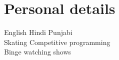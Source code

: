 \documentclass[]{deedy-resume-openfont}
\begin{document}
\begin{minipage}[t][18cm]{0.33\textwidth}

\section{Personal details}
English \textbullet{} Hindi \textbullet{} Punjabi\\
Skating \textbullet{} Competitive programming \\Binge watching shows
\sectionsep

%
%

\end{minipage}%
\hfill
\end{document}
